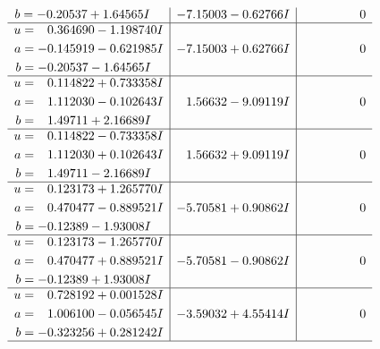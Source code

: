 \documentclass[1p]{elsarticle_modified}
\theoremstyle{definition}
\begin{document}
$$\begin{array}{c|c|c}
\begin{aligned}
b &= -0.20537 + 1.64565 I\end{aligned}
 & -7.15003 - 0.62766 I & \phantom{-0.000000 } 0 \\ \hline\begin{aligned}
u &= \phantom{-}0.364690 - 1.198740 I \\
a &= -0.145919 - 0.621985 I \\
b &= -0.20537 - 1.64565 I\end{aligned}
 & -7.15003 + 0.62766 I & \phantom{-0.000000 } 0 \\ \hline\begin{aligned}
u &= \phantom{-}0.114822 + 0.733358 I \\
a &= \phantom{-}1.112030 - 0.102643 I \\
b &= \phantom{-}1.49711 + 2.16689 I\end{aligned}
 & \phantom{-}1.56632 - 9.09119 I & \phantom{-0.000000 } 0 \\ \hline\begin{aligned}
u &= \phantom{-}0.114822 - 0.733358 I \\
a &= \phantom{-}1.112030 + 0.102643 I \\
b &= \phantom{-}1.49711 - 2.16689 I\end{aligned}
 & \phantom{-}1.56632 + 9.09119 I & \phantom{-0.000000 } 0 \\ \hline\begin{aligned}
u &= \phantom{-}0.123173 + 1.265770 I \\
a &= \phantom{-}0.470477 - 0.889521 I \\
b &= -0.12389 - 1.93008 I\end{aligned}
 & -5.70581 + 0.90862 I & \phantom{-0.000000 } 0 \\ \hline\begin{aligned}
u &= \phantom{-}0.123173 - 1.265770 I \\
a &= \phantom{-}0.470477 + 0.889521 I \\
b &= -0.12389 + 1.93008 I\end{aligned}
 & -5.70581 - 0.90862 I & \phantom{-0.000000 } 0 \\ \hline\begin{aligned}
u &= \phantom{-}0.728192 + 0.001528 I \\
a &= \phantom{-}1.006100 - 0.056545 I \\
b &= -0.323256 + 0.281242 I\end{aligned}
 & -3.59032 + 4.55414 I & \phantom{-0.000000 } 0\\
 \hline 
 \end{array}$$\newpage$$\begin{array}{c|c|c}  

\end{array}$$
\end{document}
